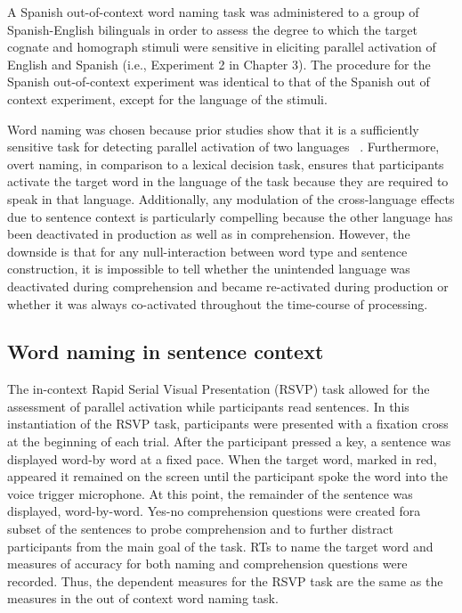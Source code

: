 A Spanish out-of-context word naming task was administered to a group of Spanish-English bilinguals in order to assess the degree to which the target cognate and homograph stimuli were sensitive in eliciting parallel activation of English and Spanish (i.e., Experiment 2 in Chapter 3). The procedure for the Spanish out-of-context experiment was identical to that of the Spanish out of context experiment, except for the language of the stimuli. 

Word naming was chosen because prior studies show that it is a sufficiently sensitive task for detecting parallel activation of two languages ~\citep{Schwartz2007}. Furthermore, overt naming, in comparison to a lexical decision task, ensures that participants activate the target word in the language of the task because they are required to speak in that language. Additionally, any modulation of the cross-language effects due to sentence context is particularly compelling because the other language has been deactivated in production as well as in comprehension. However, the downside is that for any null-interaction between word type and sentence construction, it is impossible to tell whether the unintended language was deactivated during comprehension and became re-activated during production or whether it was always co-activated throughout the time-course of processing. 

\subsection{Word naming in sentence context}
\label{wordnaminginsentencecontext}

The in-context Rapid Serial Visual Presentation (RSVP) task allowed for the assessment of parallel activation while participants read sentences. In this instantiation of the RSVP task, participants were presented with a fixation cross at the beginning of each trial. After the participant pressed a key, a sentence was displayed word-by word at a fixed pace. When the target word, marked in red, appeared it remained on the screen until the participant spoke the word into the voice trigger microphone. At this point, the remainder of the sentence was displayed, word-by-word. Yes-no comprehension questions were created fora subset of the sentences to probe comprehension and to further distract participants from the main goal of the task. RTs to name the target word and measures of accuracy for both naming and comprehension questions were recorded. Thus, the dependent measures for the RSVP task are the same as the measures in the out of context word naming task.

